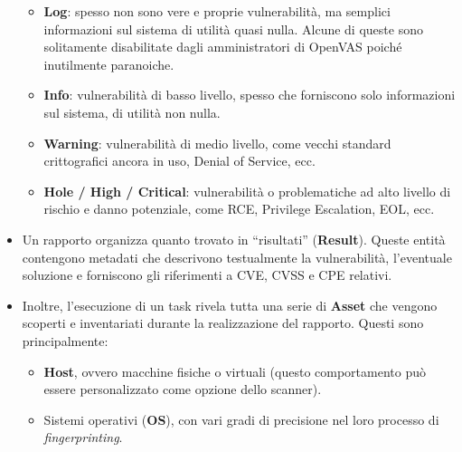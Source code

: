 \begin{itemize}
\begin{itemize}
        \item \textbf{Log}: spesso non sono vere e proprie vulnerabilità, ma semplici informazioni sul sistema di utilità quasi nulla. Alcune di queste sono solitamente disabilitate dagli amministratori di OpenVAS poiché inutilmente paranoiche.
        \item \textbf{Info}: vulnerabilità di basso livello, spesso che forniscono solo informazioni sul sistema, di utilità non nulla.
        \item \textbf{Warning}: vulnerabilità di medio livello, come vecchi standard crittografici ancora in uso, Denial of Service, ecc.
        \item \textbf{Hole / High / Critical}: vulnerabilità o problematiche ad alto livello di rischio e danno potenziale, come RCE, Privilege Escalation, EOL, ecc.
    \end{itemize}
    \item Un rapporto organizza quanto trovato in ``risultati'' (\textbf{Result}). Queste entità contengono metadati che descrivono testualmente la vulnerabilità, l'eventuale soluzione e forniscono gli riferimenti a CVE, CVSS e CPE relativi.
    \item Inoltre, l'esecuzione di un task rivela tutta una serie di \textbf{Asset} che vengono scoperti e inventariati durante la realizzazione del rapporto. Questi sono principalmente:
    \begin{itemize}
        \item \textbf{Host}, ovvero macchine fisiche o virtuali (questo comportamento può essere personalizzato come opzione dello scanner).
        \item Sistemi operativi (\textbf{OS}), con vari gradi di precisione nel loro processo di \emph{fingerprinting}.
    \end{itemize}
\end{itemize}

